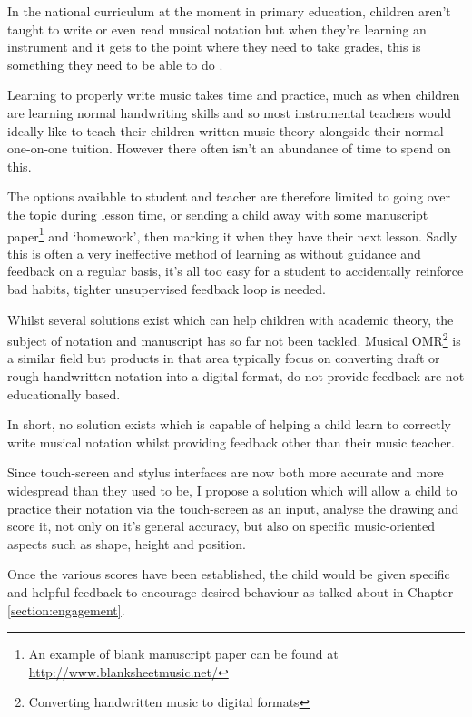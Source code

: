 In the national curriculum at the moment in primary education, children aren't taught to write or even read musical notation \Parencite{Attai5} but when they're learning an instrument and it gets to the point where they need to take grades, this is something they need to be able to do \Parencite{whyMusicTheory}.

Learning to properly write music takes time and practice, much as when children are learning normal handwriting skills and so most instrumental teachers would ideally like to teach their children written music theory alongside their normal one-on-one tuition. However there often isn't an abundance of time to spend on this.

The options available to student and teacher are therefore limited to going over the topic during lesson time, or sending a child away with some manuscript paper\footnote{An example of blank manuscript paper can be found at \url{http://www.blanksheetmusic.net/}} and `homework', then marking it when they have their next lesson. Sadly this is often a very ineffective method of learning as without guidance and feedback on a regular basis, it's all too easy for a student to accidentally reinforce bad habits, tighter unsupervised feedback loop is needed.

Whilst several solutions exist which can help children with academic theory, the subject of notation and manuscript has so far not been tackled. Musical OMR\footnote{Converting handwritten music to digital formats} is a similar field but products in that area typically focus on converting draft or rough handwritten notation into a digital format, do not provide feedback are not educationally based.

In short, no solution exists which is capable of helping a child learn to correctly write musical notation whilst providing feedback other than their music teacher.

Since touch-screen and stylus interfaces are now both more accurate and more widespread than they used to be, I propose a solution which will allow a child to practice their notation via the touch-screen as an input, analyse the drawing and score it, not only on it's general accuracy, but also on specific music-oriented aspects such as shape, height and position.

Once the various scores have been established, the child would be given specific and helpful feedback to encourage desired behaviour as talked about in Chapter \ref{section:engagement}.
